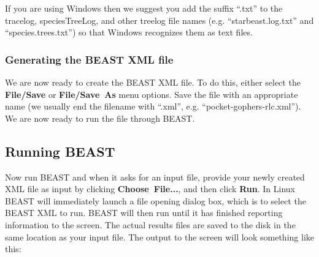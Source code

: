 \documentclass{article}
\begin{document}
If you are using Windows then we suggest you add the suffix ``.txt'' to the
tracelog, speciesTreeLog, and other treelog file names (e.g.
``starbeast.log.txt'' and ``species.trees.txt'') so that Windows recognizes them as text files.

\subsubsection*{Generating the BEAST XML file}

We are now ready to create the BEAST XML file. To do this, either select the
\textbf{File/Save} or \textbf{File/Save~As} menu options. Save the file with an
appropriate name (we usually end the filename with ``.xml'', e.g.
``pocket-gophers-rlc.xml''). We are now ready to run the file through BEAST.

\subsection*{Running BEAST}

Now run BEAST and when it asks for an input file, provide your newly created XML
file as input by clicking \textbf{Choose~File...}, and then click \textbf{Run}.
In Linux BEAST will immediately launch a file opening dialog box, which is to
select the BEAST XML to run. BEAST will then run until it has finished reporting
information to the screen. The actual results files are saved to the disk in the
same location as your input file. The output to the screen will look something
like this:
\end{document}
